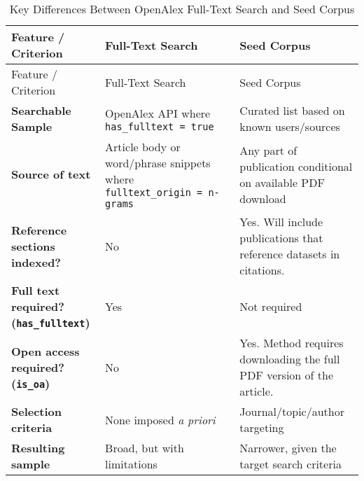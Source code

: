 \documentclass[
  letterpaper,
  DIV=11,
  numbers=noendperiod]{scrartcl}
\begin{document}
\begin{longtable}[]{@{}
  >{\raggedright\arraybackslash}p{}
  >{\raggedright\arraybackslash}p{}
  >{\raggedright\arraybackslash}p{}@{}}
\caption{Key Differences Between OpenAlex Full-Text Search and Seed
Corpus}\label{tbl-oa-methods}\tabularnewline
\toprule\noalign{}
\begin{minipage}[b]{\linewidth}\raggedright
Feature / Criterion
\end{minipage} & \begin{minipage}[b]{\linewidth}\raggedright
Full-Text Search
\end{minipage} & \begin{minipage}[b]{\linewidth}\raggedright
Seed Corpus
\end{minipage} \\
\midrule\noalign{}
\endfirsthead
\toprule\noalign{}
\begin{minipage}[b]{\linewidth}\raggedright
Feature / Criterion
\end{minipage} & \begin{minipage}[b]{\linewidth}\raggedright
Full-Text Search
\end{minipage} & \begin{minipage}[b]{\linewidth}\raggedright
Seed Corpus
\end{minipage} \\
\midrule\noalign{}
\endhead
\bottomrule\noalign{}
\endlastfoot
\textbf{Searchable Sample } & OpenAlex API where
\texttt{has\_fulltext\ =\ true} & Curated list based on known
users/sources \\
\textbf{Source of text} & Article body or word/phrase snippets where
\texttt{fulltext\_origin\ =\ n-grams} & Any part of publication
conditional on available PDF download \\
\textbf{Reference sections indexed?} & No & Yes. Will include
publications that reference datasets in citations. \\
\textbf{Full text required? (\texttt{has\_fulltext})} & Yes & Not
required \\
\textbf{Open access required? (\texttt{is\_oa})} & No & Yes. Method
requires downloading the full PDF version of the article. \\
\textbf{Selection criteria} & None imposed \emph{a priori} &
Journal/topic/author targeting \\
\textbf{Resulting sample} & Broad, but with limitations & Narrower,
given the target search criteria \\
\end{longtable}
\end{document}
